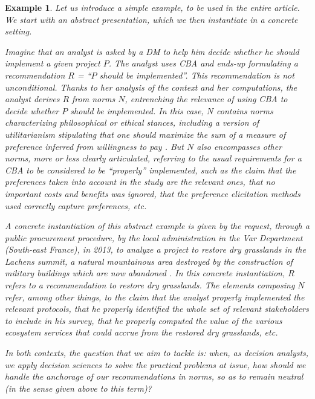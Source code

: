 \documentclass[preprint, french, english, 11pt, authoryear]{elsarticle}%
\newtheorem{example}{Example}
\begin{document}
\begin{example}
Let us introduce a simple example, to be used in the entire article. %
We start with an abstract presentation, which we then instantiate in a concrete setting.

Imagine that an analyst is asked by a DM%
 to help him decide whether he should implement a given project $P$.
The analyst uses CBA%
 \citep{layard_cost-benefit_1994} and ends-up formulating a recommendation $R$ = “$P$ should be implemented”.
This recommendation is not unconditional.
Thanks to her analysis of the context and her computations, the analyst derives $R$ from norms $N$, entrenching the relevance of using CBA%
 to decide whether $P$ should be implemented.
In this case, $N$ contains norms characterizing philosophical or ethical stances, including a version of utilitarianism stipulating that one should maximize the sum of a measure of preference inferred from willingness to pay \citep{meinard_ethical_2016}. 
But $N$ also encompasses other norms, more or less clearly articulated, referring to the usual requirements for a CBA%
 to be considered to be ``properly'' implemented, such as the claim that the preferences taken into account in the study are the relevant ones,
that no important costs and benefits was ignored, that the preference elicitation methods used correctly capture preferences, etc.

A concrete instantiation of this abstract example is given by the request, through a public procurement procedure, by the local administration in the Var Department (South-east France), in 2013, to analyze a project to restore dry grasslands in the Lachens summit, 
a natural mountainous area destroyed by the construction of military buildings which are now abandoned \citep{meinard_etude_2015}.
In this concrete instantiation, $R$ refers to a recommendation to restore dry grasslands. 
The elements composing $N$ refer, among other things, to the claim that the analyst properly implemented the relevant protocols, 
that he properly identified the whole set of relevant stakeholders to include in his survey, that he properly computed the value of the various ecosystem services that could accrue from the restored dry grasslands, etc.

In both contexts, the question that we aim to tackle is: when, as decision analysts, we apply decision sciences to solve the practical problems at issue, how should we handle the anchorage of our recommendations in norms, so as to remain neutral (in the sense given above to this term)?
\end{example}
\end{document}
